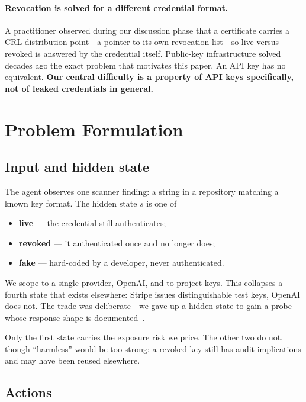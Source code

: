 \documentclass{article}
\begin{document}
\paragraph{Revocation is solved for a different credential format.}
A practitioner observed during our discussion phase that a certificate carries a
CRL distribution point---a pointer to its own revocation list---so
live-versus-revoked is answered by the credential itself. Public-key
infrastructure solved decades ago the exact problem that motivates this paper.
An API key has no equivalent. \textbf{Our central difficulty is a property of
API keys specifically, not of leaked credentials in general.}

\section{Problem Formulation}

\subsection{Input and hidden state}

The agent observes one scanner finding: a string in a repository matching a
known key format. The hidden state $s$ is one of

\begin{itemize}
\item \textbf{live} --- the credential still authenticates;
\item \textbf{revoked} --- it authenticated once and no longer does;
\item \textbf{fake} --- hard-coded by a developer, never authenticated.
\end{itemize}

We scope to a single provider, OpenAI, and to project keys. This collapses a
fourth state that exists elsewhere: Stripe issues distinguishable test keys,
OpenAI does not. The trade was deliberate---we gave up a hidden state to gain a
probe whose response shape is documented~\cite{openai2026admin}.

Only the first state carries the exposure risk we price. The other two do not,
though ``harmless'' would be too strong: a revoked key still has audit
implications and may have been reused elsewhere.

\subsection{Actions}
\end{document}
